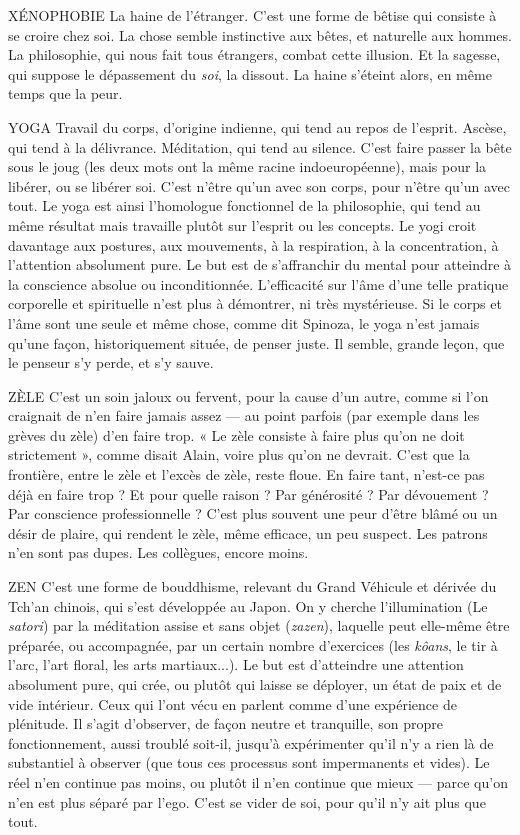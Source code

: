 XÉNOPHOBIE La haine de l'étranger. C’est une forme de bêtise qui consiste
à se croire chez soi. La chose semble instinctive aux bêtes, et
naturelle aux hommes. La philosophie, qui nous fait tous étrangers, combat
cette illusion. Et la sagesse, qui suppose le dépassement du {\it soi}, la dissout. La
haine s’éteint alors, en même temps que la peur.

YOGA Travail du corps, d’origine indienne, qui tend au repos de l'esprit.
Ascèse, qui tend à la délivrance. Méditation, qui tend au silence.
C’est faire passer la bête sous le joug (les deux mots ont la même racine indoeuropéenne),
mais pour la libérer, ou se libérer soi. C’est n’être qu’un avec son
corps, pour n'être qu’un avec tout. Le yoga est ainsi l’homologue fonctionnel de
la philosophie, qui tend au même résultat mais travaille plutôt sur l'esprit ou les
concepts. Le yogi croit davantage aux postures, aux mouvements, à la respiration,
à la concentration, à l'attention absolument pure. Le but est de s’affranchir du
mental pour atteindre à la conscience absolue ou inconditionnée. L'efficacité sur
l’âme d’une telle pratique corporelle et spirituelle n’est plus à démontrer, ni très
mystérieuse. Si le corps et l’âme sont une seule et même chose, comme dit Spinoza,
le yoga n’est jamais qu’une façon, historiquement située, de penser juste. Il
semble, grande leçon, que le penseur s’y perde, et s’y sauve.

ZÈLE C’est un soin jaloux ou fervent, pour la cause d’un autre, comme si
l’on craignait de n’en faire jamais assez — au point parfois (par exemple
dans les grèves du zèle) d’en faire trop. « Le zèle consiste à faire plus qu’on ne
doit strictement », comme disait Alain, voire plus qu’on ne devrait. C’est que
la frontière, entre le zèle et l’excès de zèle, reste floue. En faire tant, n’est-ce pas
déjà en faire trop ? Et pour quelle raison ? Par générosité ? Par dévouement ?
Par conscience professionnelle ? C’est plus souvent une peur d’être blâmé ou
un désir de plaire, qui rendent le zèle, même efficace, un peu suspect. Les
patrons n’en sont pas dupes. Les collègues, encore moins.

ZEN C'est une forme de bouddhisme, relevant du Grand Véhicule et dérivée
du Tch’an chinois, qui s’est développée au Japon. On y cherche
l’illumination (Le {\it satori}) par la méditation assise et sans objet ({\it zazen}), laquelle
peut elle-même être préparée, ou accompagnée, par un certain nombre d’exercices
(les {\it kôans}, le tir à l'arc, l’art floral, les arts martiaux...). Le but est
d'atteindre une attention absolument pure, qui crée, ou plutôt qui laisse se
déployer, un état de paix et de vide intérieur. Ceux qui l’ont vécu en parlent
comme d’une expérience de plénitude. Il s’agit d’observer, de façon neutre et
tranquille, son propre fonctionnement, aussi troublé soit-il, jusqu’à expérimenter
qu’il n’y a rien là de substantiel à observer (que tous ces processus sont
impermanents et vides). Le réel n’en continue pas moins, ou plutôt il n’en
continue que mieux — parce qu’on n’en est plus séparé par l’ego. C’est se vider
de soi, pour qu’il n’y ait plus que tout.

